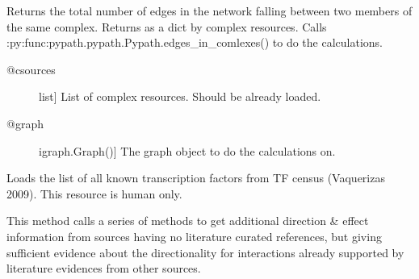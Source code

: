 \documentclass[letterpaper,10pt,english]{sphinxmanual}
\begin{document}
\begin{fulllineitems}
\begin{fulllineitems}
\label{\detokenize{main:pypath.main.PyPath.sum_in_complex}}
Returns the total number of edges in the network falling
between two members of the same complex.
Returns as a dict by complex resources.
Calls :py:func:pypath.pypath.Pypath.edges\_in\_comlexes()
to do the calculations.
\begin{description}
\item[{@csources}] \leavevmode{[}list{]}
List of complex resources. Should be already loaded.

\item[{@graph}] \leavevmode{[}igraph.Graph(){]}
The graph object to do the calculations on.

\end{description}

\end{fulllineitems}


\begin{fulllineitems}
\label{\detokenize{main:pypath.main.PyPath.table_latex}}
\end{fulllineitems}


\begin{fulllineitems}
\label{\detokenize{main:pypath.main.PyPath.tfs_list}}
Loads the list of all known transcription factors from TF census
(Vaquerizas 2009). This resource is human only.

\end{fulllineitems}


\begin{fulllineitems}
\label{\detokenize{main:pypath.main.PyPath.third_source_directions}}
This method calls a series of methods to get
additional direction \& effect information
from sources having no literature curated references,
but giving sufficient evidence about the directionality
for interactions already supported by literature
evidences from other sources.


\end{fulllineitems}
\end{fulllineitems}
\end{document}
